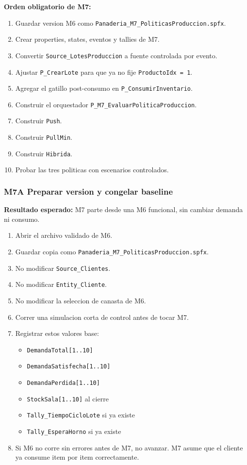 \documentclass[11pt]{article}
\newcommand{\simio}[1]{\texttt{#1}}
\newcommand{\state}[1]{\texttt{#1}}
\newcommand{\proc}[1]{\texttt{#1}}
\begin{document}
\textbf{Orden obligatorio de M7:}
\begin{enumerate}
  \item Guardar version M6 como \simio{Panaderia\_M7\_PoliticasProduccion.spfx}.
  \item Crear properties, states, eventos y tallies de M7.
  \item Convertir \simio{Source\_LotesProduccion} a fuente controlada por evento.
  \item Ajustar \proc{P\_CrearLote} para que ya no fije \state{ProductoIdx = 1}.
  \item Agregar el gatillo post-consumo en \proc{P\_ConsumirInventario}.
  \item Construir el orquestador \proc{P\_M7\_EvaluarPoliticaProduccion}.
  \item Construir \simio{Push}.
  \item Construir \simio{PullMin}.
  \item Construir \simio{Hibrida}.
  \item Probar las tres politicas con escenarios controlados.
\end{enumerate}

\subsubsection{M7A Preparar version y congelar baseline}
\textbf{Resultado esperado:} M7 parte desde una M6 funcional, sin cambiar demanda ni consumo.

\begin{enumerate}
  \item Abrir el archivo validado de M6.
  \item Guardar copia como \simio{Panaderia\_M7\_PoliticasProduccion.spfx}.
  \item No modificar \simio{Source\_Clientes}.
  \item No modificar \simio{Entity\_Cliente}.
  \item No modificar la seleccion de canasta de M6.
  \item Correr una simulacion corta de control antes de tocar M7.
  \item Registrar estos valores base:
  \begin{itemize}
    \item \state{DemandaTotal[1..10]}
    \item \state{DemandaSatisfecha[1..10]}
    \item \state{DemandaPerdida[1..10]}
    \item \state{StockSala[1..10]} al cierre
    \item \simio{Tally\_TiempoCicloLote} si ya existe
    \item \simio{Tally\_EsperaHorno} si ya existe
  \end{itemize}
  \item Si M6 no corre sin errores antes de M7, no avanzar. M7 asume que el cliente ya consume item por item correctamente.
\end{enumerate}
\end{document}
